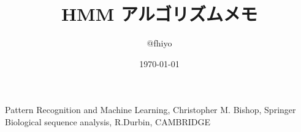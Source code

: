 \documentclass[a4paper]{jsarticle}
\title{HMM アルゴリズムメモ}
\author{@fhiyo}
\date{\today}
\begin{document}
\maketitle













\begin{thebibliography}{9}
Pattern Recognition and Machine Learning, Christopher M. Bishop, Springer\\
Biological sequence analysis, R.Durbin, CAMBRIDGE
\end{thebibliography}
\end{document}
